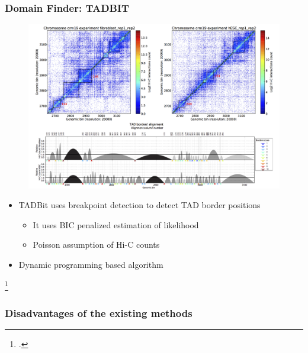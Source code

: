 \documentclass[12pt]{beamer}
\begin{document}
\begin{frame}
\frametitle{Domain Finder: TADBIT}

\begin{figure}
\includegraphics[scale=0.5]{tadbit.png}
\end{figure}

\begin{itemize}
\item TADBit uses breakpoint detection to detect TAD border positions
\begin{itemize}
\item It uses BIC penalized estimation of likelihood
\vspace{0.1cm}
\item Poisson assumption of Hi-C counts
\end{itemize}
\vspace{0.1cm}
\item Dynamic programming based algorithm
\end{itemize}

\footcitetext{tadbit}

\end{frame}


\begin{frame}
\frametitle{Disadvantages of the existing methods}


\end{frame}



\end{document}
